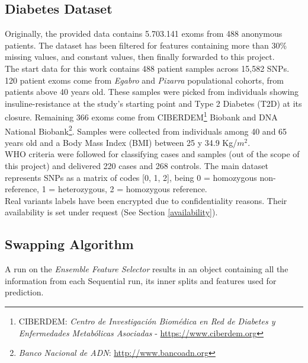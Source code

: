 \subsection{Diabetes Dataset}
Originally, the provided data contains 5.703.141 exoms from 488 anonymous patients. The dataset has been filtered for features containing more than 30\% missing values, and constant values, then finally forwarded to this project.
\\

The start data for this work contains 488 patient samples across 15,582 SNPs. 120 patient exoms come from \emph{Egabro} and \emph{Pizarra} populational cohorts, from patients above 40 years old. These samples were picked from individuals showing insuline-resistance at the study's starting point and Type 2 Diabetes (T2D) at its closure. Remaining 366 exoms come from CIBERDEM\footnote{CIBERDEM: \emph{Centro de Investigación Biomédica en Red de Diabetes y Enfermedades Metabólicas Asociadas} - \url{https://www.ciberdem.org}} Biobank and DNA National Biobank\footnote{\emph{Banco Nacional de ADN}: \url{http://www.bancoadn.org}}. Samples were collected from individuals among 40 and 65 years old and a Body Mass Index (BMI) between 25 y 34.9 Kg/$m^{2}$.
\\

WHO criteria were followed for classifying cases and samples (out of the scope of this project) and delivered 220 cases and 268 controls. The main dataset represents SNPs as a matrix of codes [0, 1, 2], being 0 = homozygous non-reference, 1 = heterozygous, 2 = homozygous reference. 
\\

Real variants labels have been encrypted due to confidentiality reasons. Their availability is set under request (See Section \ref{availability}).



\subsection{Swapping Algorithm}
\label{section:methods:pipeline}
A run on the \emph{Ensemble Feature Selector} results in an object containing all the information from each Sequential run, its inner splits and features used for prediction.
\\

